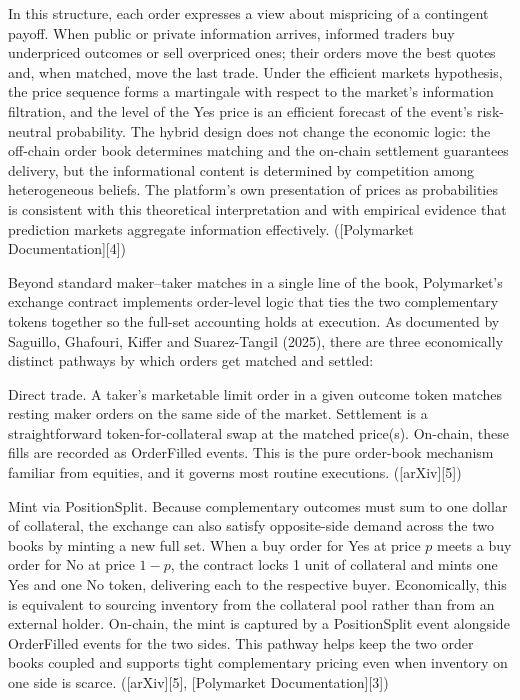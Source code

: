 In this structure, each order expresses a view about mispricing of a contingent payoff. When public or private information arrives, informed traders buy underpriced outcomes or sell overpriced ones; their orders move the best quotes and, when matched, move the last trade. Under the efficient markets hypothesis, the price sequence forms a martingale with respect to the market’s information filtration, and the level of the Yes price is an efficient forecast of the event’s risk-neutral probability. The hybrid design does not change the economic logic: the off-chain order book determines matching and the on-chain settlement guarantees delivery, but the informational content is determined by competition among heterogeneous beliefs. The platform’s own presentation of prices as probabilities is consistent with this theoretical interpretation and with empirical evidence that prediction markets aggregate information effectively. ([Polymarket Documentation][4])


Beyond standard maker–taker matches in a single line of the book, Polymarket’s exchange contract implements order-level logic that ties the two complementary tokens together so the full-set accounting holds at execution. As documented by Saguillo, Ghafouri, Kiffer and Suarez-Tangil (2025), there are three economically distinct pathways by which orders get matched and settled:

Direct trade. A taker’s marketable limit order in a given outcome token matches resting maker orders on the same side of the market. Settlement is a straightforward token-for-collateral swap at the matched price(s). On-chain, these fills are recorded as OrderFilled events. This is the pure order-book mechanism familiar from equities, and it governs most routine executions. ([arXiv][5])

Mint via PositionSplit. Because complementary outcomes must sum to one dollar of collateral, the exchange can also satisfy opposite-side demand across the two books by minting a new full set. When a buy order for Yes at price $p$ meets a buy order for No at price $1-p$, the contract locks 1 unit of collateral and mints one Yes and one No token, delivering each to the respective buyer. Economically, this is equivalent to sourcing inventory from the collateral pool rather than from an external holder. On-chain, the mint is captured by a PositionSplit event alongside OrderFilled events for the two sides. This pathway helps keep the two order books coupled and supports tight complementary pricing even when inventory on one side is scarce. ([arXiv][5], [Polymarket Documentation][3])


